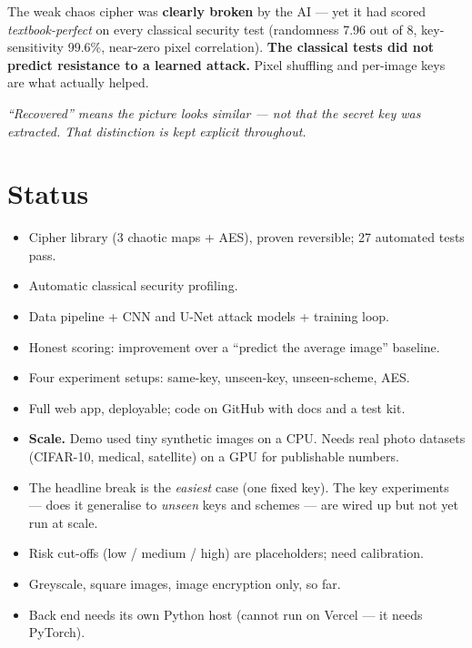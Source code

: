 \documentclass[11pt]{article}
\newcommand{\yes}{\textcolor{grn}{\ding{51}}\;}
\newcommand{\gap}{\textcolor{amber}{\ding{72}}\;}
\begin{document}
\begin{tcolorbox}[plaincard]
The weak chaos cipher was \textbf{clearly broken} by the AI --- yet it had scored
\emph{textbook-perfect} on every classical security test (randomness 7.96 out of 8,
key-sensitivity 99.6\%, near-zero pixel correlation). \textbf{The classical tests did not
predict resistance to a learned attack.} Pixel shuffling and per-image keys are what
actually helped.

\smallskip
\textit{``Recovered'' means the picture looks similar --- not that the secret key was
extracted. That distinction is kept explicit throughout.}
\end{tcolorbox}

\section{Status}

\begin{tcbraster}[raster columns=2, raster equal height=rows, raster column skip=8pt]

\begin{tcolorbox}[card={Done}]
\begin{itemize}[leftmargin=1.1em]
  \item \yes Cipher library (3 chaotic maps + AES), proven reversible; 27 automated tests pass.
  \item \yes Automatic classical security profiling.
  \item \yes Data pipeline + CNN and U-Net attack models + training loop.
  \item \yes Honest scoring: improvement over a ``predict the average image'' baseline.
  \item \yes Four experiment setups: same-key, unseen-key, unseen-scheme, AES.
  \item \yes Full web app, deployable; code on GitHub with docs and a test kit.
\end{itemize}
\end{tcolorbox}

\begin{tcolorbox}[card={Remaining \& limitations}]
\begin{itemize}[leftmargin=1.1em]
  \item \gap \textbf{Scale.} Demo used tiny synthetic images on a CPU. Needs real photo
        datasets (CIFAR-10, medical, satellite) on a GPU for publishable numbers.
  \item \gap The headline break is the \emph{easiest} case (one fixed key). The key
        experiments --- does it generalise to \emph{unseen} keys and schemes --- are
        wired up but not yet run at scale.
  \item \gap Risk cut-offs (low / medium / high) are placeholders; need calibration.
  \item \gap Greyscale, square images, image encryption only, so far.
  \item \gap Back end needs its own Python host (cannot run on Vercel --- it needs PyTorch).
\end{itemize}
\end{tcolorbox}

\end{tcbraster}
\end{document}
